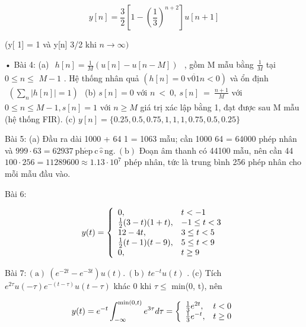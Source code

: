 \documentclass[
  10
]{article}
\begin{document}
\[
y [ n ] = \frac {3}{2} \left[ 1 - \left(\frac {1}{3}\right) ^ {n + 2} \right] u [ n + 1 ]
\]

(y{[} 1{]} = 1 và y{[}n{]} 3/2 khi \(n \to \infty )\)

• Bài 4: (a)
\(\begin{array} { r } { h [ n ] = \frac { 1 } { M } ( u [ n ] - u [ n - M ] ) } \end{array}\)
, gồm M mẫu bằng \(\textstyle { \frac { 1 } { M } }\) tại
\(0 \leq n \leq\) \(M - 1\) . Hệ thống nhân quả
\(( h [ n ] = 0 { \mathrm { ~ v } } { \ddot { 0 1 } } n < 0 )\) và ổn
định
\(\begin{array} { r } { ( \sum _ { n } | h [ n ] | = 1 ) } \end{array}\)
(b) \(s [ n ] = 0\) với
\(\textstyle n \ < \ 0 , \ s [ n ] \ = \ { \frac { n + 1 } { M } }\) với
\(0 \leq n \leq M - 1 , s [ n ] = 1\) với \(n \geq M\) giá trị xác lập
bằng 1, đạt được sau M mẫu (hệ thống FIR). (c)
\(y [ n ] = \{ 0 . 2 5 , 0 . 5 , 0 . 7 5 , 1 , 1 , 1 , 0 . 7 5 , 0 . 5 , 0 . 2 5 \}\)

Bài 5: (a) Đầu ra dài 1000 + 64 1 = 1063 mẫu; cần 1000 64 = 64000 phép
nhân và
\(9 9 9 \cdot 6 3 = 6 2 9 3 7 ~ \mathrm { p h } \mathrm { { \acute { e } p } ~ c \hat { \circ } n g . ~ ( b ) }\)
Đoạn âm thanh có 44100 mẫu, nên cần 44
\(1 0 0 \cdot 2 5 6 = 1 1 2 8 9 6 0 0 \approx 1 . 1 3 \cdot 1 0 ^ { 7 }\)
phép nhân, tức là trung bình 256 phép nhân cho mỗi mẫu đầu vào.

Bài 6:

\[
y (t) = \left\{ \begin{array}{l l} 0, & t <   - 1 \\ \frac {1}{2} (3 - t) (1 + t), & - 1 \leq t <   3 \\ 1 2 - 4 t, & 3 \leq t <   5 \\ \frac {1}{2} (t - 1) (t - 9), & 5 \leq t <   9 \\ 0, & t \geq 9 \end{array} \right.
\]

Bài
\(7 \colon ( \mathrm { a } ) \ ( e ^ { - 2 t } - e ^ { - 3 t } ) u ( t ) . \ ( \mathrm { b } ) \ t e ^ { - t } u ( t )\)
. (c) Tích
\(e ^ { 2 \tau } u ( - \tau ) e ^ { - ( t - \tau ) } u ( t - \tau )\)
khác 0 khi \(\tau \leq\) min(0, t), nên

\[
y (t) = e ^ {- t} \int_ {- \infty} ^ {\min (0, t)} e ^ {3 \tau} d \tau = \left\{ \begin{array}{l l} \frac {1}{3} e ^ {2 t}, & t <   0 \\ \frac {1}{3} e ^ {- t}, & t \geq 0 \end{array} \right.
\]
\end{document}
